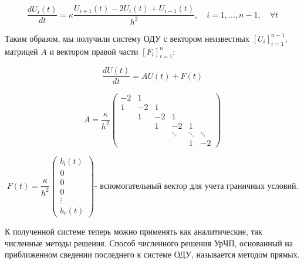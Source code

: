 \documentclass[12pt,a4paper]{article}
\begin{document}
$$
    \frac{d U_i(t)}{d t} = \kappa \frac{U_{i+1}(t) - 2 U_i(t) + U_{i-1}(t)}{h^2}, \quad i = 1,...,n-1, \quad \forall t
$$

Таким образом, мы получили систему ОДУ с вектором неизвестных $\left[U_i \right]_{i=1}^{n-1}$, матрицей $A$ и вектором правой части $\left[F_i\right]_{i = 1}^{n}$:

$$
    \frac{d U(t)}{dt} = A U(t) + F(t)
$$

$$
    A = \frac{\kappa}{h^2} 
    \begin{pmatrix} -2 & 1 &  
                    \\ 1 & -2 & 1 
                    \\ & 1 & -2 & 1 
                    \\ & & 1 & -2 & 1
                    \\ & & & \ddots & \ddots & \ddots
                    \\ & & & & 1 & -2
    \end{pmatrix}
$$

$$
    F(t) = \frac{\kappa}{h^2} 
    \begin{pmatrix} 
    b_l(t)
    \\ 0
    \\ 0
    \\ 0
    \\ \vdots 
    \\ b_r(t)
    \end{pmatrix} \text{- вспомогательный вектор для учета граничных условий.}
$$

К полученной системе теперь можно применять как аналитические, так численные методы решения. Способ численного решения УрЧП, основанный на приближенном сведении последнего к системе ОДУ, называется методом прямых.
\end{document}
